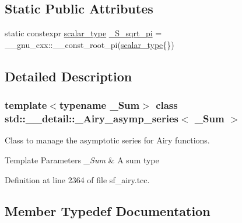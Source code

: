 \subsection*{Static Public Attributes}
\begin{DoxyCompactItemize}
\item 
static constexpr \hyperlink{classstd_1_1____detail_1_1__Airy__asymp__series_a17ec74b13ebc38d5531bf27cd31684fb}{scalar\+\_\+type} \hyperlink{classstd_1_1____detail_1_1__Airy__asymp__series_a0a4d017f86429e22f5939e689e7b93ca}{\+\_\+\+S\+\_\+sqrt\+\_\+pi} = \+\_\+\+\_\+gnu\+\_\+cxx\+::\+\_\+\+\_\+const\+\_\+root\+\_\+pi(\hyperlink{classstd_1_1____detail_1_1__Airy__asymp__series_a17ec74b13ebc38d5531bf27cd31684fb}{scalar\+\_\+type}\{\})
\end{DoxyCompactItemize}


\subsection{Detailed Description}
\subsubsection*{template$<$typename \+\_\+\+Sum$>$\newline
class std\+::\+\_\+\+\_\+detail\+::\+\_\+\+Airy\+\_\+asymp\+\_\+series$<$ \+\_\+\+Sum $>$}

Class to manage the asymptotic series for Airy functions.


\begin{DoxyTemplParams}{Template Parameters}
{\em \+\_\+\+Sum} & A sum type \\
\hline
\end{DoxyTemplParams}


Definition at line 2364 of file sf\+\_\+airy.\+tcc.



\subsection{Member Typedef Documentation}
\mbox{\label{classstd_1_1____detail_1_1__Airy__asymp__series_a17ec74b13ebc38d5531bf27cd31684fb}} 
